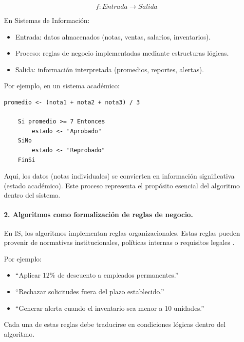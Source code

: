 \documentclass[12pt,twoside]{book}
\begin{document}
					\[
					f : Entrada \rightarrow Salida
					\]
					
					En Sistemas de Información:
					
					\begin{itemize}
						\item Entrada: datos almacenados (notas, ventas, salarios, inventarios).
						\item Proceso: reglas de negocio implementadas mediante estructuras lógicas.
						\item Salida: información interpretada (promedios, reportes, alertas).
					\end{itemize}
					
					\noindent
					Por ejemplo, en un sistema académico:
					
					\begin{lstlisting}[style=upsamStyle, caption={Algoritmo simple de transformación de datos en información.}, label={lst:AlgTransformacionIS}, basicstyle=\small\ttfamily]
	promedio <- (nota1 + nota2 + nota3) / 3
	
	Si promedio >= 7 Entonces
		estado <- "Aprobado"
	SiNo
		estado <- "Reprobado"
	FinSi \end{lstlisting}
					
					\noindent
					Aquí, los datos (notas individuales) se convierten en información significativa (estado académico). Este proceso representa el propósito esencial del algoritmo dentro del sistema.
					
					\paragraph{2. Algoritmos como formalización de reglas de negocio.} En IS, los algoritmos implementan reglas organizacionales. Estas reglas pueden provenir de normativas institucionales, políticas internas o requisitos legales \cite{Sommerville2015Software}. 
					
					Por ejemplo:
					
					\begin{itemize}
						\item “Aplicar 12\% de descuento a empleados permanentes.”
						\item “Rechazar solicitudes fuera del plazo establecido.”
						\item “Generar alerta cuando el inventario sea menor a 10 unidades.”
					\end{itemize}
					
					\noindent
					Cada una de estas reglas debe traducirse en condiciones lógicas dentro del algoritmo.
					
\end{document}
